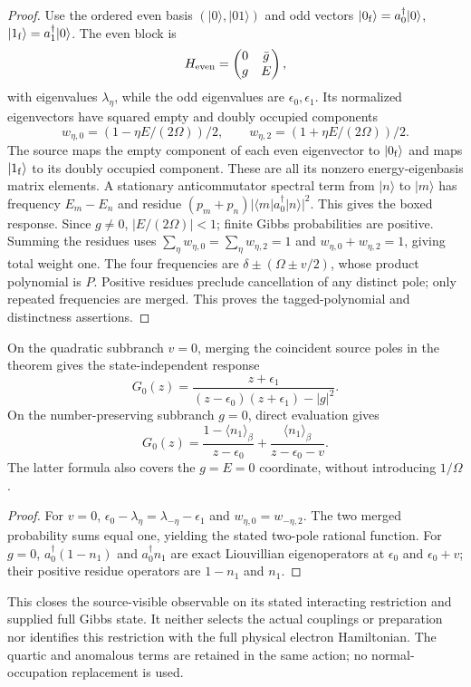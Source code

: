 \documentclass[11pt,a4paper]{article}
\begin{document}
\begin{proof}
Use the ordered even basis $(|0\rangle,|01\rangle)$ and odd
vectors $|0_{\rm f}\rangle=a_0^\dagger|0\rangle$,
$|1_{\rm f}\rangle=a_1^\dagger|0\rangle$. The even block is
\[
 H_{\rm even}=\begin{pmatrix}0&\bar g\\g&E\end{pmatrix},
\]
with eigenvalues $\lambda_\eta$, while the odd eigenvalues are
$\epsilon_0,\epsilon_1$. Its normalized eigenvectors have squared
empty and doubly occupied components
\[
 w_{\eta,0}=(1-\eta E/(2\Omega))/2,\qquad
 w_{\eta,2}=(1+\eta E/(2\Omega))/2.
\]
The source maps the empty component of each even eigenvector to
$|0_{\rm f}\rangle$ and maps $|1_{\rm f}\rangle$ to its doubly
occupied component. These are all its nonzero energy-eigenbasis
matrix elements. A stationary anticommutator spectral term from
$|n\rangle$ to $|m\rangle$ has frequency $E_m-E_n$ and residue
$(p_m+p_n)|\langle m|a_0^\dagger|n\rangle|^2$.
This gives the boxed response. Since $g\ne0$, $|E/(2\Omega)|<1$;
finite Gibbs probabilities are positive. Summing the residues uses
$\sum_\eta w_{\eta,0}=\sum_\eta w_{\eta,2}=1$ and
$w_{\eta,0}+w_{\eta,2}=1$, giving total weight one.
The four frequencies are $\delta\pm(\Omega\pm v/2)$, whose product
polynomial is $P$. Positive residues preclude cancellation of any
distinct pole; only repeated frequencies are merged. This proves the
tagged-polynomial and distinctness assertions.
\end{proof}

\begin{corollary}
\label{p5c:cor:v248-paired-source-limits}
On the quadratic subbranch $v=0$, merging the coincident source poles
in the theorem gives the state-independent response
\[
 \boxed{G_0(z)=\frac{z+\epsilon_1}
 {(z-\epsilon_0)(z+\epsilon_1)-|g|^2}.}
\]
On the number-preserving subbranch $g=0$, direct evaluation gives
\[
 \boxed{G_0(z)=\frac{1-\langle n_1\rangle_\beta}{z-\epsilon_0}
 +\frac{\langle n_1\rangle_\beta}{z-\epsilon_0-v}.}
\]
The latter formula also covers the $g=E=0$ coordinate, without
introducing $1/\Omega$.
\end{corollary}
\begin{proof}
For $v=0$, $\epsilon_0-\lambda_\eta=
\lambda_{-\eta}-\epsilon_1$ and
$w_{\eta,0}=w_{-\eta,2}$. The two merged probability sums equal
one, yielding the stated two-pole rational function. For $g=0$,
$a_0^\dagger(1-n_1)$ and $a_0^\dagger n_1$ are exact
Liouvillian eigenoperators at $\epsilon_0$ and $\epsilon_0+v$;
their positive residue operators are $1-n_1$ and $n_1$.
\end{proof}
This closes the source-visible observable on its stated interacting
restriction and supplied full Gibbs state. It neither selects the actual
couplings or preparation nor identifies this restriction with the full
physical electron Hamiltonian. The quartic and anomalous terms are
retained in the same action; no normal-occupation replacement is used.
\end{document}
